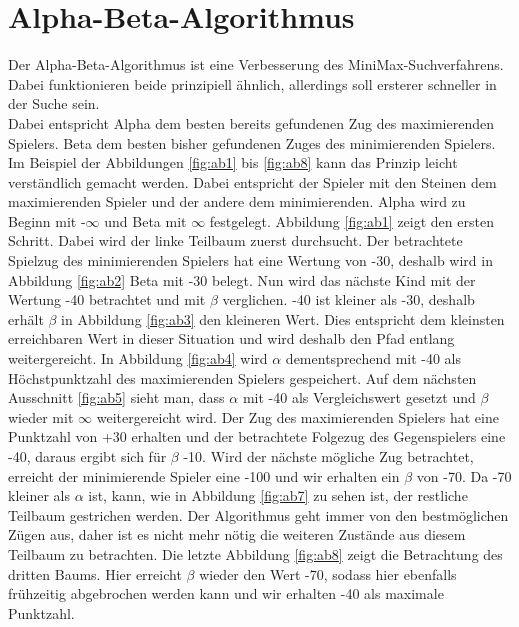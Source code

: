 \section{Alpha-Beta-Algorithmus}
\label{ch:Entwurf:sec:1.AB-Algo}
Der Alpha-Beta-Algorithmus ist eine Verbesserung des MiniMax-Suchverfahrens. Dabei funktionieren beide prinzipiell ähnlich, allerdings soll ersterer schneller in der Suche sein.\\
Dabei entspricht Alpha dem besten bereits gefundenen Zug des maximierenden Spielers. Beta dem besten bisher gefundenen Zuges des minimierenden Spielers. Im Beispiel der Abbildungen \ref{fig:ab1} bis \ref{fig:ab8} kann das Prinzip leicht verständlich gemacht werden. Dabei entspricht der Spieler mit den Steinen dem maximierenden Spieler und der andere dem minimierenden. Alpha wird zu Beginn mit -$\infty$ und Beta mit $\infty$  festgelegt. Abbildung \ref{fig:ab1} zeigt den ersten Schritt. Dabei wird der linke Teilbaum zuerst durchsucht. Der betrachtete Spielzug des minimierenden Spielers hat eine Wertung von -30, deshalb wird in Abbildung \ref{fig:ab2} Beta mit -30 belegt. Nun wird das nächste Kind mit der Wertung -40 betrachtet und mit $\beta$ verglichen. -40 ist kleiner als -30, deshalb erhält $\beta$ in Abbildung \ref{fig:ab3} den kleineren Wert. Dies entspricht dem kleinsten erreichbaren Wert in dieser Situation und wird deshalb den Pfad entlang weitergereicht. In Abbildung \ref{fig:ab4} wird $\alpha$ dementsprechend mit -40 als Höchstpunktzahl des maximierenden Spielers gespeichert. Auf dem nächsten Ausschnitt \ref{fig:ab5} sieht man, dass $\alpha$ mit -40 als Vergleichswert gesetzt und $\beta$ wieder mit $\infty$ weitergereicht wird. Der Zug des maximierenden Spielers hat eine Punktzahl von +30 erhalten und der betrachtete Folgezug des Gegenspielers eine -40, daraus ergibt sich für $\beta$ -10. Wird der nächste mögliche Zug betrachtet, erreicht der minimierende Spieler eine -100 und wir erhalten ein $\beta$ von -70. Da -70 kleiner als $\alpha$ ist, kann, wie in Abbildung \ref{fig:ab7} zu sehen ist, der restliche Teilbaum gestrichen werden. Der Algorithmus geht immer von den bestmöglichen Zügen aus, daher ist es nicht mehr nötig die weiteren Zustände aus diesem Teilbaum zu betrachten. Die letzte Abbildung \ref{fig:ab8} zeigt die Betrachtung des dritten Baums. Hier erreicht $\beta$ wieder den Wert -70, sodass hier ebenfalls frühzeitig abgebrochen werden kann und wir erhalten -40 als maximale Punktzahl.



